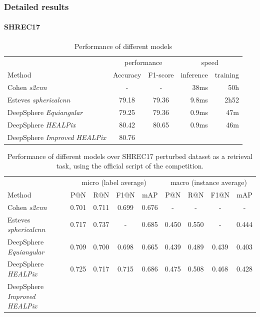 \documentclass{article} %
\begin{document}
\subsubsection*{Detailed results}
\paragraph*{SHREC17}

\begin{table}
    \centering
    \begin{tabular}{l|c c r r}
        \multicolumn{1}{l}{} & \multicolumn{2}{c}{performance} & \multicolumn{2}{c}{speed}\\
        \cmidrule(lr){2-3} \cmidrule(lr){4-5}
        \multicolumn{1}{l}{Method} & Accuracy & F1-score & inference & training \\ \hline
        Cohen \emph{s2cnn} & - & - & 38ms & 50h\\
        Esteves \emph{sphericalcnn} & 79.18 & 79.36 & 9.8ms & 2h52\\ \hline
        DeepSphere \emph{Equiangular} & 79.25 & 79.36 & 0.9ms & 47m \\
        DeepSphere \emph{HEALPix} & 80.42 & 80.65 & 0.9ms & 46m\\
        DeepSphere \emph{Improved HEALPix} & 80.76 & & &
    \end{tabular}
    \caption{Performance of different models}
    \label{tab:SHREC17_class}
\end{table}

\begin{table}
    \centering
    \begin{tabular}{l|c c c c|c c c c}
     & \multicolumn{4}{c|}{micro (label average)} & \multicolumn{4}{c}{macro (instance average)} \\
    Method & P@N & R@N & F1@N & mAP & P@N & R@N & F1@N & mAP \\ \hline
    Cohen \emph{s2cnn} & 0.701 & 0.711 & 0.699 & 0.676 & - & - & - & - \\
    Esteves \emph{sphericalcnn} & 0.717 & 0.737 & - & 0.685 & 0.450 & 0.550 & - & 0.444\\ \hline
    DeepSphere \emph{Equiangular} & 0.709 & 0.700 & 0.698 & 0.665 & 0.439 & 0.489 & 0.439 & 0.403 \\
    DeepSphere \emph{HEALPix} & 0.725 & 0.717 & 0.715 & 0.686 & 0.475 & 0.508 & 0.468 & 0.428\\
    DeepSphere \emph{Improved HEALPix} & & & & &
    \end{tabular}
    \caption{Performance of different models over SHREC17 perturbed dataset as a retrieval task, using the official script of the competition.}
    \label{tab:SHREC17_retriev}
\end{table}
\end{document}
